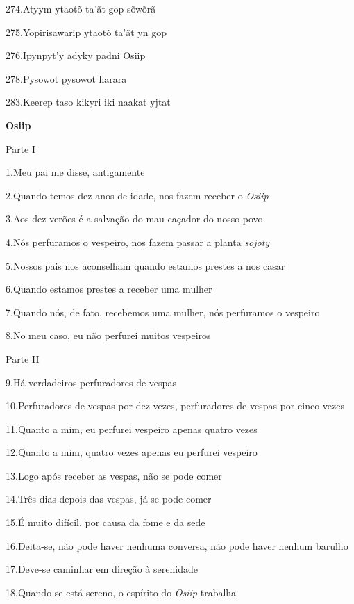 274.Atyym ytaotõ ta'ãt gop sõwõrã

275.Yopirisawarip ytaotõ ta'ãt yn gop

276.Ipynpyt'y adyky padni Osiip

278.Pysowot pysowot harara

283.Keerep taso kikyri iki naakat yjtat

\textbf{Osiip}

Parte I

1.Meu pai me disse, antigamente

2.Quando temos dez anos de idade, nos fazem receber o \emph{Osiip}

3.Aos dez verões é a salvação do mau caçador do nosso povo

4.Nós perfuramos o vespeiro, nos fazem passar a planta \emph{sojoty}

5.Nossos pais nos aconselham quando estamos prestes a nos casar

6.Quando estamos prestes a receber uma mulher

\protect\hypertarget{_heading=h.2s8eyo1}{}{}7.Quando nós, de fato,
recebemos uma mulher, nós perfuramos o vespeiro

\protect\hypertarget{_heading=h.gp7kaovf2puw}{}{}8.No meu caso, eu não
perfurei muitos vespeiros

\protect\hypertarget{_heading=h.840ntey5lqsw}{}{}

\protect\hypertarget{_heading=h.4xmjdt7j1sz5}{}{}Parte II

\protect\hypertarget{_heading=h.hfk8ae5n1jrj}{}{}

9.Há verdadeiros perfuradores de vespas

10.Perfuradores de vespas por dez vezes, perfuradores de vespas por
cinco vezes

11.Quanto a mim, eu perfurei vespeiro apenas quatro vezes

12.Quanto a mim, quatro vezes apenas eu perfurei vespeiro

\protect\hypertarget{_heading=h.17dp8vu}{}{}13.Logo após receber as
vespas, não se pode comer

14.Três dias depois das vespas, já se pode comer

15.É muito difícil, por causa da fome e da sede

16.Deita-se, não pode haver nenhuma conversa, não pode haver nenhum
barulho

17.Deve-se caminhar em direção à serenidade

18.Quando se está sereno, o espírito do \emph{Osiip} trabalha

